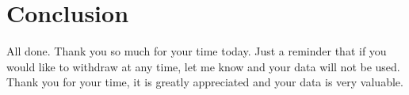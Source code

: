 \documentclass[a4 paper, 10pt]{article}
\begin{document}
\section*{Conclusion}
    \begin{itshape}
        All done. Thank you so much for your time today. Just a reminder that if you would like to withdraw at any time, let me know and your data will not be used. Thank you for your time, it is greatly appreciated and your data is very valuable.
    \end{itshape}
\end{document}
